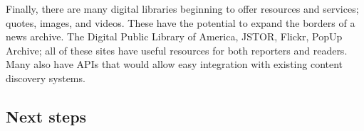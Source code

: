 Finally, there are many digital libraries beginning to offer resources and services; quotes, images, and videos. These have the potential to expand the borders of a news archive. The Digital Public Library of America, JSTOR, Flickr, PopUp Archive; all of these sites have useful resources for both reporters and readers. Many also have APIs that would allow easy integration with existing content discovery systems.


\subsection{Next steps}


